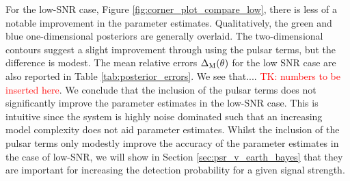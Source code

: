 \documentclass[fleqn,usenatbib,useAMS]{mnras}
\begin{document}
		
For the low-SNR case,  Figure \ref{fig:corner_plot_compare_low}, there is less of a notable improvement in the parameter estimates. Qualitatively, the green and blue one-dimensional posteriors are generally overlaid. The two-dimensional contours suggest a slight improvement through using the pulsar terms, but the difference is modest. The mean relative errors $\Delta_{\rm M}(\theta)$ for the low SNR case are also reported in Table \ref{tab:posterior_errors}. We see that.... \textcolor{red}{TK: numbers to be inserted here}. We conclude that the inclusion of the pulsar terms does not significantly improve the parameter estimates in the low-SNR case. This is intuitive since the system is highly noise dominated such that an increasing model complexity does not aid parameter estimates. Whilst the inclusion of the pulsar terms only modestly improve the accuracy of the parameter estimates in the case of low-SNR, we will show in Section \ref{sec:psr_v_earth_bayes} that they are important for increasing the detection probability for a given signal strength. \newline 
		
\end{document}
